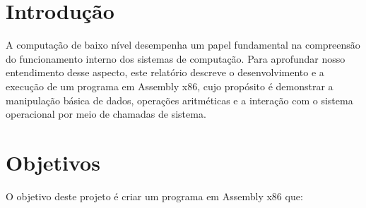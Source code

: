 \documentclass[
	12pt,				%
	openright,			%
	oneside,			%
	a4paper,			%
	chapter=TITLE,		%
	english,			%
	french,				%
	spanish,			%
	brazil				%
	]{abntex2}
\theoremstyle{definition}
\begin{document}
\frenchspacing 

\imprimircapa


\imprimirfolhaderosto

\newpage

\setlength{\absparsep}{18pt} %

\tableofcontents*
\cleardoublepage
\textual


\chapter{Introdução}

A computação de baixo nível desempenha um papel fundamental na compreensão 
do funcionamento interno dos sistemas de computação. Para aprofundar nosso entendimento 
desse aspecto, este relatório descreve o desenvolvimento e a execução de um programa 
em Assembly x86, cujo propósito é demonstrar a manipulação básica de dados,
operações aritméticas e a interação com o sistema operacional por meio de chamadas de sistema.
\chapter{Objetivos}

O objetivo deste projeto é criar um programa em Assembly x86 que:
\end{document}
